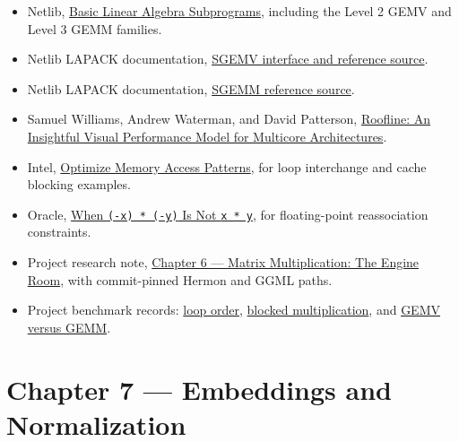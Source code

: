 \documentclass[
  10pt,
]{article}
\providecommand{\tightlist}{%
  \setlength{\itemsep}{0pt}\setlength{\parskip}{0pt}}
\begin{document}
\begin{itemize}
\tightlist
\item
  Netlib, \href{https://www.netlib.org/blas/}{Basic Linear Algebra
  Subprograms}, including the Level 2 GEMV and Level 3 GEMM families.
\item
  Netlib LAPACK documentation,
  \href{https://netlib.org/lapack/explore-html/d7/dda/group__gemv_ga0d35d880b663ad18204bb23bd186e380.html}{SGEMV
  interface and reference source}.
\item
  Netlib LAPACK documentation,
  \href{https://www.netlib.org/lapack/explore-html/d4/de2/sgemm_8f_source.html}{SGEMM
  reference source}.
\item
  Samuel Williams, Andrew Waterman, and David Patterson,
  \href{https://www2.eecs.berkeley.edu/Pubs/TechRpts/2008/EECS-2008-134.pdf}{Roofline:
  An Insightful Visual Performance Model for Multicore Architectures}.
\item
  Intel,
  \href{https://www.intel.com/content/www/us/en/docs/advisor/cookbook/2023-0/optimize-memory-access-patterns.html}{Optimize
  Memory Access Patterns}, for loop interchange and cache blocking
  examples.
\item
  Oracle,
  \href{https://docs.oracle.com/cd/E37069_01/html/E39019/gnabm.html}{When
  \texttt{(-x)\ *\ (-y)} Is Not \texttt{x\ *\ y}}, for floating-point
  reassociation constraints.
\item
  Project research note,
  \href{https://github.com/hermonai/inside-the-llm-engine/blob/astra-visual-rewrite/research/part-02/chapter-06-matrix-multiplication-the-engine-room.md}{Chapter
  6 --- Matrix Multiplication: The Engine Room}, with commit-pinned
  Hermon and GGML paths.
\item
  Project benchmark records:
  \href{https://github.com/hermonai/inside-the-llm-engine/blob/astra-visual-rewrite/research/benchmarks/chapter-06-loop-order.md}{loop
  order},
  \href{https://github.com/hermonai/inside-the-llm-engine/blob/astra-visual-rewrite/research/benchmarks/chapter-06-blocked-matmul.md}{blocked
  multiplication}, and
  \href{https://github.com/hermonai/inside-the-llm-engine/blob/astra-visual-rewrite/research/benchmarks/chapter-06-gemv-vs-gemm.md}{GEMV
  versus GEMM}.
\end{itemize}

\clearpage

\section{Chapter 7 --- Embeddings and
Normalization}\label{chapter-7-embeddings-and-normalization}
\end{document}

